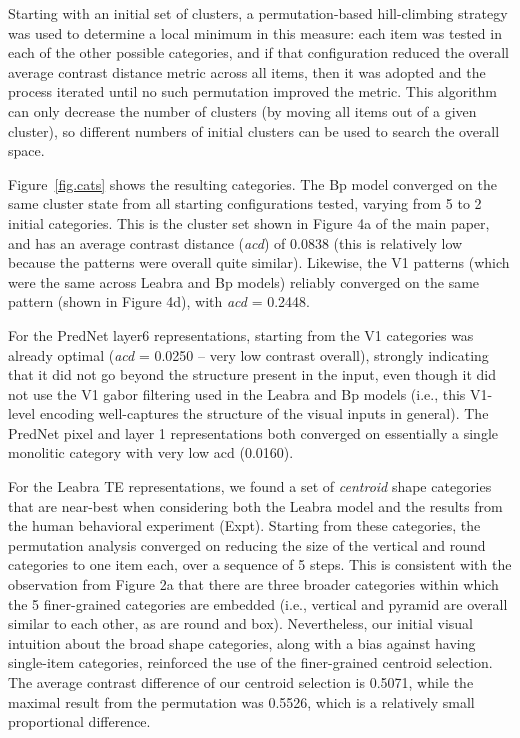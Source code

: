 \documentclass[12pt,twoside]{naturefigs}
\newif\myifpdf
\begin{document}
Starting with an initial set of clusters, a permutation-based hill-climbing strategy was used to determine a local minimum in this measure: each item was tested in each of the other possible categories, and if that configuration reduced the overall average contrast distance metric across all items, then it was adopted and the process iterated until no such permutation improved the metric.  This algorithm can only decrease the number of clusters (by moving all items out of a given cluster), so different numbers of initial clusters can be used to search the overall space.

Figure~\ref{fig.cats} shows the resulting categories. The Bp model converged on the same cluster state from all starting configurations tested, varying from 5 to 2 initial categories.  This is the cluster set shown in Figure 4a of the main paper, and has an average contrast distance ({\em acd}) of 0.0838 (this is relatively low because the patterns were overall quite similar).  Likewise, the V1 patterns (which were the same across Leabra and Bp models) reliably converged on the same pattern (shown in Figure 4d), with {\em acd} = 0.2448.

For the PredNet layer6 representations, starting from the V1 categories was already optimal ({\em acd} = 0.0250 -- very low contrast overall), strongly indicating that it did not go beyond the structure present in the input, even though it did not use the V1 gabor filtering used in the Leabra and Bp models (i.e., this V1-level encoding well-captures the structure of the visual inputs in general).  The PredNet pixel and layer 1 representations both converged on essentially a single monolitic category with very low acd (0.0160).


For the Leabra TE representations, we found a set of {\em centroid} shape categories that are near-best when considering both the Leabra model and the results from the human behavioral experiment (Expt).  Starting from these  categories, the permutation analysis converged on reducing the size of the vertical and round categories to one item each, over a sequence of 5 steps.  This is consistent with the observation from Figure 2a that there are three broader categories within which the 5 finer-grained categories are embedded (i.e., vertical and pyramid are overall similar to each other, as are round and box).  Nevertheless, our initial visual intuition about the broad shape categories, along with a bias against having single-item categories, reinforced the use of the finer-grained centroid selection.  The average contrast difference of our centroid selection is 0.5071, while the maximal result from the permutation was 0.5526, which is a relatively small proportional difference.
\end{document}
